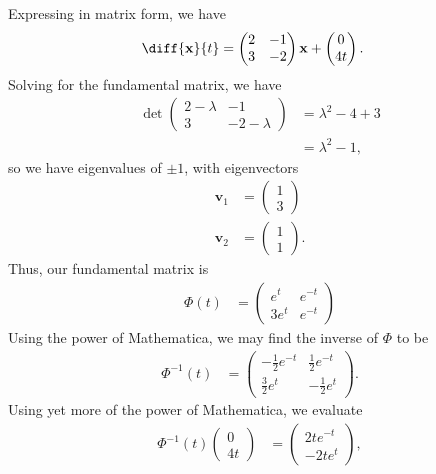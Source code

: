 \documentclass[10pt]{mypackage}
\begin{document}
\RaggedRight
\renewcommand{\arraystretch}{1.5}
\begin{solution}[8.3, Problem 12]
  Expressing in matrix form, we have
  \begin{align*}
    \diff{\mathbf{x}}{t} &= \begin{pmatrix}2 & -1\\3 & -2\end{pmatrix}\mathbf{x} + \begin{pmatrix}0\\4t\end{pmatrix}.
  \end{align*}
  Solving for the fundamental matrix, we have
  \begin{align*}
    \det \begin{pmatrix}2-\lambda & -1 \\ 3 & -2-\lambda\end{pmatrix} &= \lambda^2 - 4 + 3\\
                                  &= \lambda^2 - 1,
  \end{align*}
  so we have eigenvalues of $\pm 1$, with eigenvectors
  \begin{align*}
    \mathbf{v}_1 &= \begin{pmatrix}1\\3\end{pmatrix}\\
    \mathbf{v}_2 &= \begin{pmatrix}1\\1\end{pmatrix}.
  \end{align*}
  Thus, our fundamental matrix is
  \begin{align*}
    \Phi(t) &= \begin{pmatrix}e^{t} & e^{-t} \\ 3e^{t} & e^{-t}\end{pmatrix} 
  \end{align*}
  Using the power of Mathematica, we may find the inverse of $\Phi$ to be
  \begin{align*}
    \Phi^{-1}\left( t \right) &= \begin{pmatrix}-\frac{1}{2}e^{-t} & \frac{1}{2}e^{-t} \\ \frac{3}{2}e^{t} & -\frac{1}{2}e^{t}\end{pmatrix}.
  \end{align*}
  Using yet more of the power of Mathematica, we evaluate
  \begin{align*}
    \Phi^{-1}(t) \begin{pmatrix}0\\4t\end{pmatrix} &= \begin{pmatrix}2te^{-t} \\ -2te^{t}\end{pmatrix},

\end{align*}
\end{solution}
\end{document}
